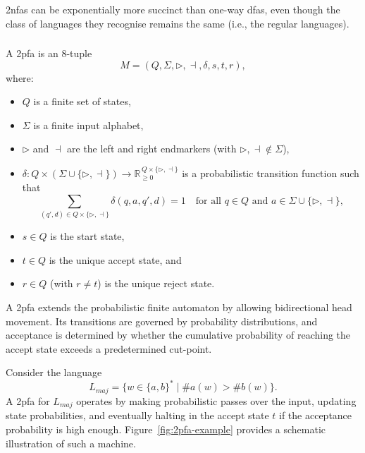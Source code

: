 \begin{observation}
\glspl{2nfa} can be exponentially more succinct than one-way \glspl{dfa}, even though the class of languages they recognise remains the same (i.e., the regular languages).
\end{observation}

\subsubsection{}
\label{subsubsec:2pfa}

\begin{definition}
A \gls{2pfa} is an 8-tuple
\[
M = (Q, \Sigma, \triangleright, \dashv, \delta, s, t, r),
\]
where:
\begin{itemize}
    \item \(Q\) is a finite set of states,
    \item \(\Sigma\) is a finite input alphabet,
    \item \(\triangleright\) and \(\dashv\) are the left and right endmarkers (with \(\triangleright,\dashv \notin \Sigma\)),
    \item \(\delta: Q \times (\Sigma \cup \{\triangleright,\dashv\}) \to \mathbb{R}_{\ge 0}^{\,Q \times \{\triangleright,\dashv\}}\) is a probabilistic transition function such that
    \[
    \sum_{(q',d)\in Q\times\{\triangleright,\dashv\}} \delta(q,a,q',d) = 1 \quad \text{for all } q \in Q \text{ and } a \in \Sigma \cup \{\triangleright,\dashv\},
    \]
    \item \(s\in Q\) is the start state,
    \item \(t\in Q\) is the unique accept state, and
    \item \(r\in Q\) (with \(r\neq t\)) is the unique reject state.
\end{itemize}
\end{definition}

\begin{remark}
A \gls{2pfa} extends the probabilistic finite automaton by allowing bidirectional head movement. Its transitions are governed by probability distributions, and acceptance is determined by whether the cumulative probability of reaching the accept state exceeds a predetermined cut-point.
\end{remark}

\begin{example}
Consider the language 
\[
L_{maj} = \{ w \in \{a,b\}^* \mid \#a(w) > \#b(w) \}.
\]
A \gls{2pfa} for \(L_{maj}\) operates by making probabilistic passes over the input, updating state probabilities, and eventually halting in the accept state \(t\) if the acceptance probability is high enough. Figure~\ref{fig:2pfa-example} provides a schematic illustration of such a machine.
\end{example}

